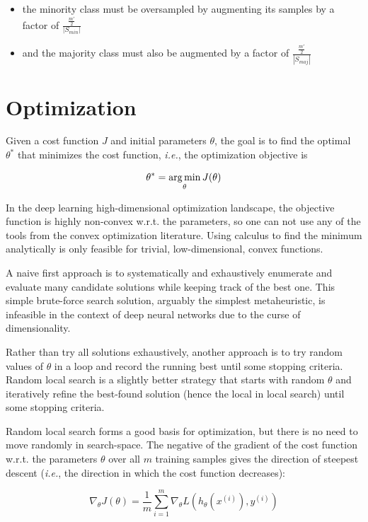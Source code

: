 \begin{itemize}
    \item the minority class must be oversampled by augmenting its samples  by a factor of $\frac{\frac{m'}{2}}{|S_{min}|}$
    \item and the majority class must also be augmented by a factor of $\frac{\frac{m'}{2}}{|S_{maj}|}$
\end{itemize}

\section{Optimization}

Given a cost function $J$ and initial parameters $\theta$, the goal is to find the optimal $\theta^*$ that minimizes the cost function, \textit{i.e.}, the optimization objective is

\begin{equation}
\theta^{*} = \operatorname*{arg\,min}_{\theta} J(\theta)
\end{equation}

In the deep learning high-dimensional optimization landscape, the objective function is highly non-convex w.r.t. the parameters, so one can not use any of the tools from the convex optimization literature. Using calculus to find the minimum analytically is only feasible for trivial, low-dimensional, convex functions.

A naive first approach is to systematically and exhaustively enumerate and evaluate many candidate solutions while keeping track of the best one. This simple brute-force search solution, arguably the simplest metaheuristic, is infeasible in the context of deep neural networks due to the curse of dimensionality.

Rather than try all solutions exhaustively, another approach is to try random values of $\theta$ in a loop and record the running best until some stopping criteria. Random local search is a slightly better strategy that starts with random $\theta$ and iteratively refine the best-found solution (hence the local in local search) until some stopping criteria.

Random local search forms a good basis for optimization, but there is no need to move randomly in search-space. The negative of the gradient of the cost function w.r.t. the parameters $\theta$ over all $m$ training samples gives the direction of steepest descent (\textit{i.e.}, the direction in which the cost function decreases):

\begin{equation}
\nabla_{\theta} J(\theta) = \frac{1}{m} \sum_{i=1}^{m} \nabla_{\theta} L(h_{\theta}(x^{(i)}), y^{(i)})
\end{equation}

